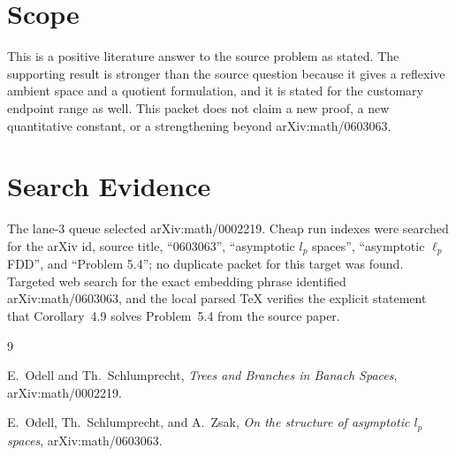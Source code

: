 \documentclass[11pt]{article}
\begin{document}
\section*{Scope}

This is a positive literature answer to the source problem as stated.  The
supporting result is stronger than the source question because it gives a
reflexive ambient space and a quotient formulation, and it is stated for the
customary endpoint range as well.  This packet does not claim a new proof, a
new quantitative constant, or a strengthening beyond arXiv:math/0603063.

\section*{Search Evidence}

The lane-3 queue selected arXiv:math/0002219.  Cheap run indexes were searched
for the arXiv id, source title, ``0603063'', ``asymptotic \(l_p\) spaces'',
``asymptotic \(\ell_p\) FDD'', and ``Problem 5.4''; no duplicate packet for
this target was found.  Targeted web search for the exact embedding phrase
identified arXiv:math/0603063, and the local parsed TeX verifies the explicit
statement that Corollary~4.9 solves Problem~5.4 from the source paper.

{\raggedright
\begin{thebibliography}{9}

E.~Odell and Th.~Schlumprecht,
\emph{Trees and Branches in Banach Spaces},
arXiv:math/0002219.

E.~Odell, Th.~Schlumprecht, and A.~Zsak,
\emph{On the structure of asymptotic \(l_p\) spaces},
arXiv:math/0603063.

\end{thebibliography}
}
\end{document}
